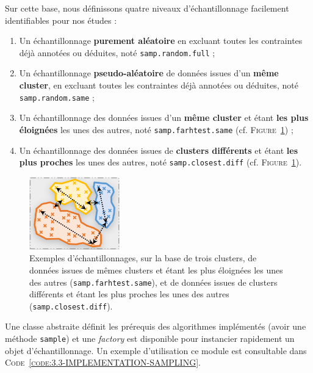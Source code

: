 		Sur cette base, nous définissons quatre niveaux d'échantillonnage facilement identifiables pour nos études :
		\begin{enumerate}
			\item Un échantillonnage \textbf{purement aléatoire} en excluant toutes les contraintes déjà annotées ou déduites, noté \texttt{samp.random.full} ;
			\item Un échantillonnage \textbf{pseudo-aléatoire} de données issues d'un \textbf{même cluster}, en excluant toutes les contraintes déjà annotées ou déduites, noté \texttt{samp.random.same} ;
			\item Un échantillonnage des données issues d'un \textbf{même cluster} et étant \textbf{les plus éloignées} les unes des autres, noté \texttt{samp.farhtest.same} (cf. \textsc{Figure~\ref{figure:3.3-CONTRAINTES-SAMPLING}}) ;
			\item Un échantillonnage des données issues de \textbf{clusters différents} et étant \textbf{les plus proches} les unes des autres, noté \texttt{samp.closest.diff} (cf. \textsc{Figure~\ref{figure:3.3-CONTRAINTES-SAMPLING}}).
		\end{enumerate}
		
		\begin{figure}[!htb]
			\centering
			\includegraphics[width=0.35\textwidth]{figures/example-sampling}
			\caption{
				Exemples d’échantillonnages, sur la base de trois clusters, de données issues de mêmes clusters et étant les plus éloignées les unes des autres (\texttt{samp.farhtest.same}), et de données issues de clusters différents et étant les plus proches les unes des autres (\texttt{samp.closest.diff}).
			}
			\label{figure:3.3-CONTRAINTES-SAMPLING}
		\end{figure}

		Une classe abstraite définit les prérequis des algorithmes implémentés (avoir une méthode \texttt{sample}) et une \textit{factory} est disponible pour instancier rapidement un objet d'échantillonnage.
		Un exemple d'utilisation ce module est consultable dans \textsc{Code~\ref{code:3.3-IMPLEMENTATION-SAMPLING}}.
		
